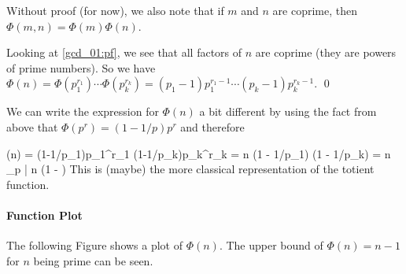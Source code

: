 Without proof (for now), we also note that if $m$ and $n$ are coprime, then $\Phi(m,n) = \Phi(m) \Phi(n)$.

Looking at \eqref{gcd_01:pf}, we see that all factors of $n$ are coprime (they are powers of prime numbers). So we have $\Phi(n) = \Phi(p_1^{r_1}) \cdots \Phi(p_k^{r_k}) = (p_1 - 1)p_1^{r_1-1} \cdots (p_k - 1)p_k^{r_k-1}$. \qed

We can write the expression for $\Phi(n)$ a bit different by using the fact from above that $\Phi(p^r) = (1-1/p)p^r$ and therefore

\bee
\Phi(n) = (1-1/p_1)p_1^{r_1} \cdots (1-1/p_k)p_k^{r_k} = n (1 - 1/p_1) \cdots (1 - 1/p_k) = n \prod_{p | n} \left(1 -  \right)
\eee
%
This is (maybe) the more classical representation of the totient function.

\paragraph{Function Plot}

The following Figure shows a plot of $\Phi(n)$. The upper bound of $\Phi(n) = n-1$ for $n$ being prime can be seen.
